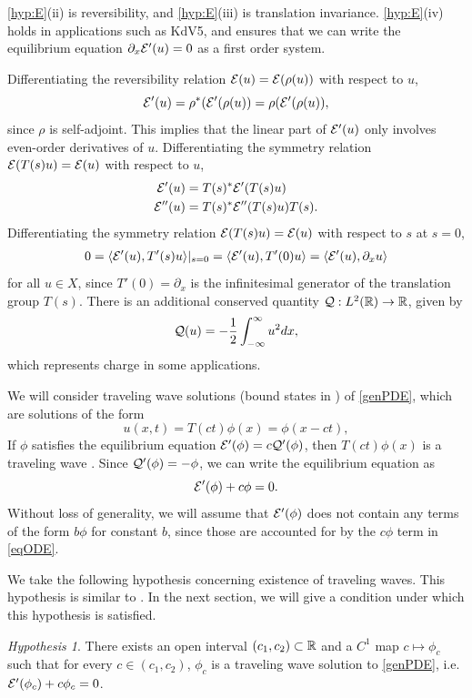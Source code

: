 \documentclass[10pt,reqno]{amsart}
\theoremstyle{plain}
\theoremstyle{definition}
\theoremstyle{remark}
\newtheorem{hypothesis}[theorem]{Hypothesis}
\numberwithin{theorem}{section}
\numberwithin{equation}{section}
\begin{document}
\noi \cref{hyp:E}(ii) is reversibility, and \cref{hyp:E}(iii) is translation invariance. \cref{hyp:E}(iv) holds in applications such as KdV5, and ensures that we can write the equilibrium equation $\partial_x \mathcal{E}'(u) = 0$ as a first order system.

Differentiating the reversibility relation $\mathcal{E}(u) = \mathcal{E}(\rho(u))$ with respect to $u$,
\[
\mathcal{E}'(u) = \rho^*( \mathcal{E}'(\rho(u) ) = \rho( \mathcal{E}'(\rho(u) ),
\]
since $\rho$ is self-adjoint. This implies that the linear part of $\mathcal{E}'(u)$ only involves even-order derivatives of $u$. Differentiating the symmetry relation $\mathcal{E}(T(s)u) = \mathcal{E}(u)$ with respect to $u$,
\begin{align}
\mathcal{E}'(u) &= T(s)^* \mathcal{E}'(T(s)u) \label{Eprimesymm} \\
\mathcal{E}''(u) &= T(s)^* \mathcal{E}''(T(s)u) T(s). \label{EHessiansymm}
\end{align}
Differentiating the symmetry relation $\mathcal{E}(T(s)u) = \mathcal{E}(u)$ with respect to $s$ at $s = 0$, 
\begin{align*}
0 = \langle \mathcal{E}'(u), T'(s) u \rangle|_{s = 0}
= \langle \mathcal{E}'(u), T'(0) u \rangle
= \langle \mathcal{E}'(u), \partial_x u \rangle
\end{align*}
for all $u \in X$, since $T'(0) = \partial_x$ is the infinitesimal generator of the translation group $T(s)$. There is an additional conserved quantity $\mathcal{Q}: L^2(\mathbb{R}) \rightarrow \mathbb{R}$, given by
\begin{equation}\label{defV}
\mathcal{Q}(u) = -\frac{1}{2} \int_{-\infty}^\infty u^2 dx,
\end{equation}
which represents charge in some applications. 

We will consider traveling wave solutions (bound states in \cite{Grillakis1987}) of \cref{genPDE}, which are solutions of the form
\begin{equation}
u(x, t) = T(ct)\phi(x) = \phi(x - ct),
\end{equation}
If $\phi$ satisfies the equilibrium equation $\mathcal{E}'(\phi) = c \mathcal{Q}'(\phi)$, then $T(ct)\phi(x)$ is a traveling wave \cite{Grillakis1987}. Since $\mathcal{Q}'(\phi) = -\phi$, we can write the equilibrium equation as
\begin{equation}\label{eqODE}
\mathcal{E}'(\phi) + c \phi = 0.
\end{equation}
Without loss of generality, we will assume that $\mathcal{E}'(\phi)$ does not contain any terms of the form $b\phi$ for constant $b$, since those are accounted for by the $c \phi$ term in \cref{eqODE}.

We take the following hypothesis concerning existence of traveling waves. This hypothesis is similar to \cite[Assumption 2]{Grillakis1987}. In the next section, we will give a condition under which this hypothesis is satisfied. 
\begin{hypothesis}\label{hyp:cinterval}
There exists an open interval $(c_1, c_2) \subset \mathbb{R}$ and a $C^1$ map $c \mapsto \phi_c$ such that for every $c \in (c_1, c_2)$, $\phi_c$ is a traveling wave solution to \cref{genPDE}, i.e. $\mathcal{E}'(\phi_c) + c \phi_c = 0$.
\end{hypothesis}
\end{document}

